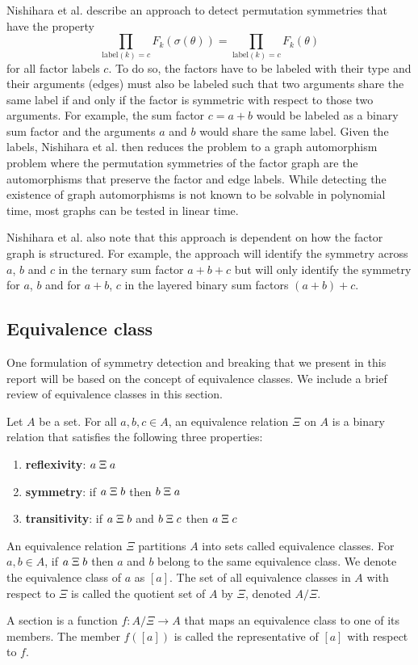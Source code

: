 Nishihara et al. describe an approach to detect permutation symmetries that have the property
\[
\prod_{\text{label}(k)=c}F_k(\sigma(\theta)) = \prod_{\text{label}(k)=c}F_k(\theta)
\]
for all factor labels $c$. To do so, the factors have to be labeled with their type and their arguments (edges) must also be labeled such that two arguments share the same label if and only if the factor is symmetric with respect to those two arguments. For example, the sum factor $c=a+b$ would be labeled as a binary sum factor and the arguments $a$ and $b$ would share the same label. Given the labels, Nishihara et al. then reduces the problem to a graph automorphism problem where the permutation symmetries of the factor graph are the automorphisms that preserve the factor and edge labels. While detecting the existence of graph automorphisms is not known to be solvable in polynomial time, most graphs can be tested in linear time.

Nishihara et al. also note that this approach is dependent on how the factor graph is structured. For example, the approach will identify the symmetry across $a$, $b$ and $c$ in the ternary sum factor $a+b+c$ but will only identify the symmetry for $a$, $b$ and for $a+b$, $c$ in the layered binary sum factors $(a+b)+c$.


\subsection{Equivalence class}

One formulation of symmetry detection and breaking that we present in this report will be based on the concept of equivalence classes. We include a brief review of equivalence classes in this section.

Let $A$ be a set. For all $a,b,c\in A$, an equivalence relation $\Xi$ on $A$ is a binary relation that satisfies the following three properties:
\begin{enumerate}

\item
\textbf{reflexivity}: $a\;\Xi\; a$

\item
\textbf{symmetry}: if $a\;\Xi\; b$ then $b\;\Xi\; a$

\item
\textbf{transitivity}: if $a\;\Xi\; b$ and $b\;\Xi\; c$ then $a\;\Xi\; c$

\end{enumerate}
An equivalence relation $\Xi$ partitions $A$ into sets called equivalence classes. For $a,b\in A$, if $a\;\Xi\; b$ then $a$ and $b$ belong to the same equivalence class. We denote the equivalence class of $a$ as $[a]$. The set of all equivalence classes in $A$ with respect to $\Xi$ is called the quotient set of $A$ by $\Xi$, denoted $A/\Xi$.

A section is a function $f:A/\Xi\rightarrow A$ that maps an equivalence class to one of its members. The member $f([a])$ is called the representative of $[a]$ with respect to $f$.

